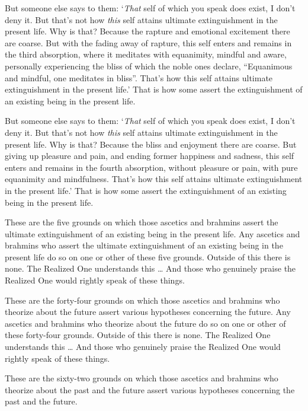 \documentclass[12pt,openany]{book}%
\begin{document}
But someone else says to them: ‘\emph{That} self of which you speak does exist, I don’t deny it. But that’s not how \emph{this} self attains ultimate extinguishment in the present life. Why is that? Because the rapture and emotional excitement there are coarse. But with the fading away of rapture, this self enters and remains in the third absorption, where it meditates with equanimity, mindful and aware, personally experiencing the bliss of which the noble ones declare, “Equanimous and mindful, one meditates in bliss”. That’s how this self attains ultimate extinguishment in the present life.’ That is how some assert the extinguishment of an existing being in the present life. 

But someone else says to them: ‘\emph{That} self of which you speak does exist, I don’t deny it. But that’s not how \emph{this} self attains ultimate extinguishment in the present life. Why is that? Because the bliss and enjoyment there are coarse. But giving up pleasure and pain, and ending former happiness and sadness, this self enters and remains in the fourth absorption, without pleasure or pain, with pure equanimity and mindfulness. That’s how this self attains ultimate extinguishment in the present life.’ That is how some assert the extinguishment of an existing being in the present life. 

These are the five grounds on which those ascetics and brahmins assert the ultimate extinguishment of an existing being in the present life. Any ascetics and brahmins who assert the ultimate extinguishment of an existing being in the present life do so on one or other of these five grounds. Outside of this there is none. The Realized One understands this … And those who genuinely praise the Realized One would rightly speak of these things. 

These are the forty-four grounds on which those ascetics and brahmins who theorize about the future assert various hypotheses concerning the future. Any ascetics and brahmins who theorize about the future do so on one or other of these forty-four grounds. Outside of this there is none. The Realized One understands this … And those who genuinely praise the Realized One would rightly speak of these things. 

These are the sixty-two grounds on which those ascetics and brahmins who theorize about the past and the future assert various hypotheses concerning the past and the future. 
\end{document}
